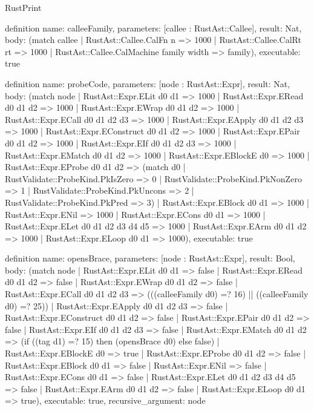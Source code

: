 \begin{lexlean}{RustPrint}
\begin{semanticmodule}
definition{
  name: calleeFamily,
  parameters: [callee : RustAst::Callee],
  result: Nat,
  body: (match callee
    | RustAst::Callee.CalFn n => 1000
    | RustAst::Callee.CalRt rt => 1000
    | RustAst::Callee.CalMachine family width => family),
  executable: true
}

definition{
  name: probeCode,
  parameters: [node : RustAst::Expr],
  result: Nat,
  body: (match node
    | RustAst::Expr.ELit d0 d1 => 1000
    | RustAst::Expr.ERead d0 d1 d2 => 1000
    | RustAst::Expr.EWrap d0 d1 d2 => 1000
    | RustAst::Expr.ECall d0 d1 d2 d3 => 1000
    | RustAst::Expr.EApply d0 d1 d2 d3 => 1000
    | RustAst::Expr.EConstruct d0 d1 d2 => 1000
    | RustAst::Expr.EPair d0 d1 d2 => 1000
    | RustAst::Expr.EIf d0 d1 d2 d3 => 1000
    | RustAst::Expr.EMatch d0 d1 d2 => 1000
    | RustAst::Expr.EBlockE d0 => 1000
    | RustAst::Expr.EProbe d0 d1 d2 => (match d0
      | RustValidate::ProbeKind.PkIsZero => 0
      | RustValidate::ProbeKind.PkNonZero => 1
      | RustValidate::ProbeKind.PkUncons => 2
      | RustValidate::ProbeKind.PkPred => 3)
    | RustAst::Expr.EBlock d0 d1 => 1000
    | RustAst::Expr.ENil => 1000
    | RustAst::Expr.ECons d0 d1 => 1000
    | RustAst::Expr.ELet d0 d1 d2 d3 d4 d5 => 1000
    | RustAst::Expr.EArm d0 d1 d2 => 1000
    | RustAst::Expr.ELoop d0 d1 => 1000),
  executable: true
}

definition{
  name: opensBrace,
  parameters: [node : RustAst::Expr],
  result: Bool,
  body: (match node
    | RustAst::Expr.ELit d0 d1 => false
    | RustAst::Expr.ERead d0 d1 d2 => false
    | RustAst::Expr.EWrap d0 d1 d2 => false
    | RustAst::Expr.ECall d0 d1 d2 d3 => (((calleeFamily d0) =? 16) || ((calleeFamily d0) =? 25))
    | RustAst::Expr.EApply d0 d1 d2 d3 => false
    | RustAst::Expr.EConstruct d0 d1 d2 => false
    | RustAst::Expr.EPair d0 d1 d2 => false
    | RustAst::Expr.EIf d0 d1 d2 d3 => false
    | RustAst::Expr.EMatch d0 d1 d2 => (if ((tag d1) =? 15) then (opensBrace d0) else false)
    | RustAst::Expr.EBlockE d0 => true
    | RustAst::Expr.EProbe d0 d1 d2 => false
    | RustAst::Expr.EBlock d0 d1 => false
    | RustAst::Expr.ENil => false
    | RustAst::Expr.ECons d0 d1 => false
    | RustAst::Expr.ELet d0 d1 d2 d3 d4 d5 => false
    | RustAst::Expr.EArm d0 d1 d2 => false
    | RustAst::Expr.ELoop d0 d1 => true),
  executable: true,
  recursive_argument: node
}


\end{semanticmodule}
\end{lexlean}
